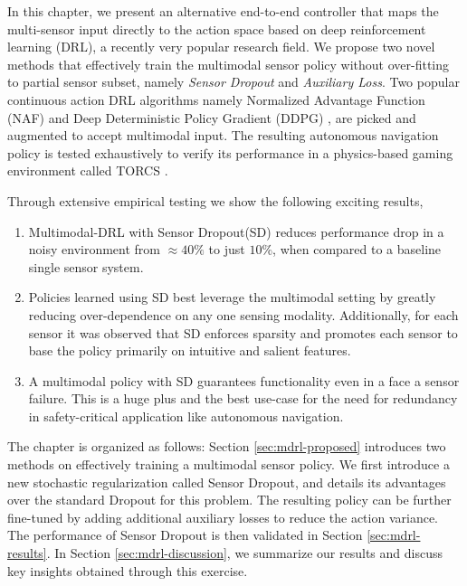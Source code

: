 \documentclass[../thesis.tex]{subfiles}
\begin{document}
 
In this chapter, we present an alternative end-to-end controller that maps the multi-sensor input directly to the action space based on deep reinforcement learning (DRL), a recently very popular research field.
We propose two novel methods that effectively train the multimodal sensor policy without over-fitting to partial sensor subset, namely \textit{Sensor Dropout} and \textit{Auxiliary Loss}.
Two popular continuous action DRL algorithms namely Normalized Advantage Function (NAF) \cite{CDQN} and Deep Deterministic Policy Gradient (DDPG) \cite{DBLP:journals/corr/LillicrapHPHETS15}, are picked and augmented to accept multimodal input. The resulting autonomous navigation policy is tested exhaustively to verify its performance in a physics-based gaming environment called TORCS \cite{wymann2000torcs}.
 
Through extensive empirical testing we show the following exciting results,
\begin{enumerate}
 
    	\item Multimodal-DRL with Sensor Dropout(SD) reduces performance drop in a noisy environment from $\approx 40\%$ to just $10\%$, when compared to a baseline single sensor system.
    	
    	\item Policies learned using SD best leverage the multimodal setting by greatly reducing over-dependence on any one sensing modality. Additionally, for each sensor it was observed that SD enforces sparsity and promotes each sensor to base the policy primarily on intuitive and salient features.
    	
    	\item A multimodal policy with SD guarantees functionality even in a face a sensor failure. This is a huge plus and the best use-case for the need for redundancy in safety-critical application like autonomous navigation.
 
\end{enumerate}
 
 
The chapter is organized as follows:
Section \ref{sec:mdrl-proposed} introduces two methods on effectively training a multimodal sensor policy. We first introduce a new stochastic regularization called Sensor Dropout, and details its advantages over the standard Dropout for this problem. The resulting policy can be further fine-tuned by adding additional auxiliary losses to reduce the action variance. The performance of Sensor Dropout is then validated in Section \ref{sec:mdrl-results}. In Section \ref{sec:mdrl-discussion}, we summarize our results and discuss key insights obtained through this exercise.
 
\end{document}
